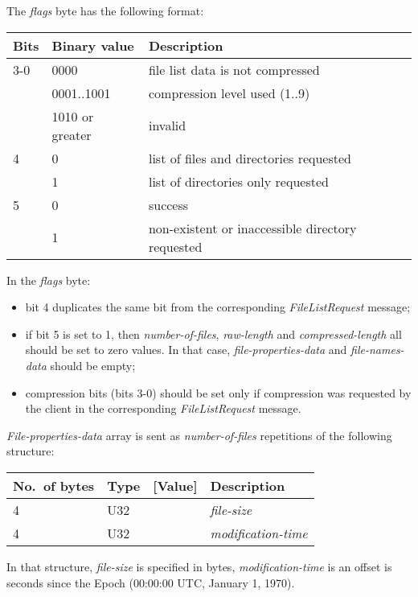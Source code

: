 \documentclass[a4paper]{article}
\newcommand{\typestr}[1]{\textit{#1}}
\begin{document}
The \typestr{flags} byte has the following format:

\begin{tabular}{l|l|l}
\hline
Bits & Binary value   & Description \\ \hline
3-0 & 0000            & file list data is not compressed \\
    & 0001..1001      & compression level used (1..9) \\
    & 1010 or greater & invalid \\
\hline
4   & 0   & list of files and directories requested \\
    & 1   & list of directories only requested \\
\hline
5   & 0   & success \\
    & 1   & non-existent or inaccessible directory requested \\
\hline
\end{tabular}

In the \typestr{flags} byte:

\begin{itemize}
\item bit 4 duplicates the same bit from the corresponding
  \typestr{FileListRequest} message;
\item if bit 5 is set to 1, then \typestr{number-of-files},
  \typestr{raw-length} and \typestr{compressed-length} all should be
  set to zero values. In that case, \typestr{file-properties-data} and
  \typestr{file-names-data} should be empty;
\item compression bits (bits 3-0) should be set only if compression
  was requested by the client in the corresponding
  \typestr{FileListRequest} message.
\end{itemize}

\typestr{File-properties-data} array is sent as
\typestr{number-of-files} repetitions of the following structure:

\begin{tabular}{l|lc|l} \hline
No.\ of bytes & Type & [Value] & Description \\ \hline
4 & U32 &  & \typestr{file-size} \\
4 & U32 &  & \typestr{modification-time} \\
\hline\end{tabular}

In that structure, \typestr{file-size} is specified in bytes,
\typestr{modification-time} is an offset is seconds since the Epoch
(00:00:00 UTC, January 1, 1970).
\end{document}
